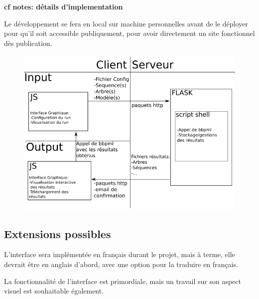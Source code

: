 \textbf{cf notes: détails d'implementation}

Le développement se fera en local sur machine personnelles
avant de le déployer pour qu'il soit accessible publiquement,
pour avoir directement un site fonctionnel dès publication.

\begin{figure}
	\includegraphics[scale=0.5]{schemaConc.png}
	\centering
\end{figure}

\pagebreak



\subsection{Extensions possibles}

L'interface sera implémentée en français durant le projet,
mais à terme, elle devrait être en anglais d'abord,
avec une option pour la traduire en français.

La fonctionnalité de l'interface est primordiale,
mais un travail sur son aspect visuel est souhaitable également.

